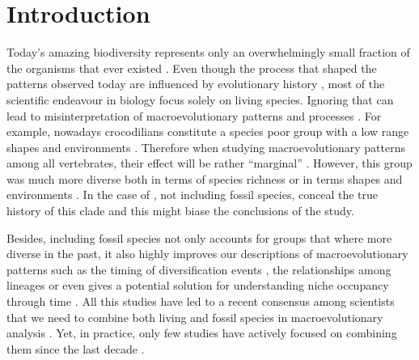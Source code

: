 \chapter{Introduction}
\label{chap:introduction}



%
% 


Today's amazing biodiversity represents only an overwhelmingly small fraction of the organisms that ever existed \citep{novacek1992ext,raup1993extinction}.
Even though the process that shaped the patterns observed today are influenced by evolutionary history \citep{fritzdiversity2013}, most of the scientific endeavour in biology focus solely on living species.
Ignoring that can lead to misinterpretation of macroevolutionary patterns and processes \citep{benton2015}.
For example, nowadays crocodilians constitute a species poor group \citep[25 species;][]{uetz2010original} with a low range shapes and environments \citep[marine or freshwater;][]{Martin2008}.
Therefore when studying macroevolutionary patterns among all vertebrates, their effect will be rather ``marginal'' \citep[e.g.][ suggests that terrestriality is a driver of diversification among living vertebrates]{Wiens2015}.
However, this group was much more diverse both in terms of species richness \citep[244 species reported in][]{Bronzati2015} or in terms shapes and environments \citep{stubbs2013}.
In the case of \cite{Wiens2015}, not including fossil species, conceal the true history of this clade and this might biase the conclusions of the study.

Besides, including fossil species not only accounts for groups that where more diverse in the past, it also highly improves our descriptions of macroevolutionary patterns such as the timing of diversification events \citep[e.g. significantly reducing node age confidence intervals;][]{ronquista2012}, the relationships among lineages \citep[e.g. solving some controversial fossil placement;][]{Dembo2015} or even gives a potential solution for understanding niche occupancy through time \citep[e.g.][]{pearmanniche2008}.
All this studies have led to a recent consensus among scientists that we need to combine both living and fossil species in macroevolutionary analysis \citep{jacksonwhat2006,quentaldiversity2010,dietlconservation2011,slaterunifying2013,fritzdiversity2013,benton2015}.
Yet, in practice, only few studies have actively focused on combining them since the last decade \citep[e.g.][]{ronquista2012,slaterphylogenetic2013,Wood01032013,beckancient2014,Arcila2015131,Dembo2015}. %


